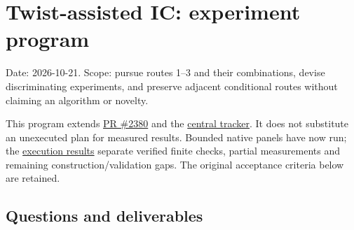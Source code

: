 \documentclass[
  10pt,
]{article}
\author{}
\date{}
\begin{document}
\section{Twist-assisted IC: experiment
program}\label{twist-assisted-ic-experiment-program}

Date: 2026-10-21. Scope: pursue routes 1--3 and their combinations,
devise discriminating experiments, and preserve adjacent conditional
routes without claiming an algorithm or novelty.

This program extends
\href{https://github.com/aburan28/crypto/pull/2380}{PR \#2380} and the
\href{../notes/index-calculus/RESEARCH_TWIST_IC_ROUTES_1_3.md}{central
tracker}. It does not substitute an unexecuted plan for measured
results. Bounded native panels have now run; the
\href{reports/EXECUTION_RESULTS.md}{execution results} separate verified
finite checks, partial measurements and remaining
construction/validation gaps. The original acceptance criteria below are
retained.

\subsection{Questions and
deliverables}\label{questions-and-deliverables}
\end{document}
